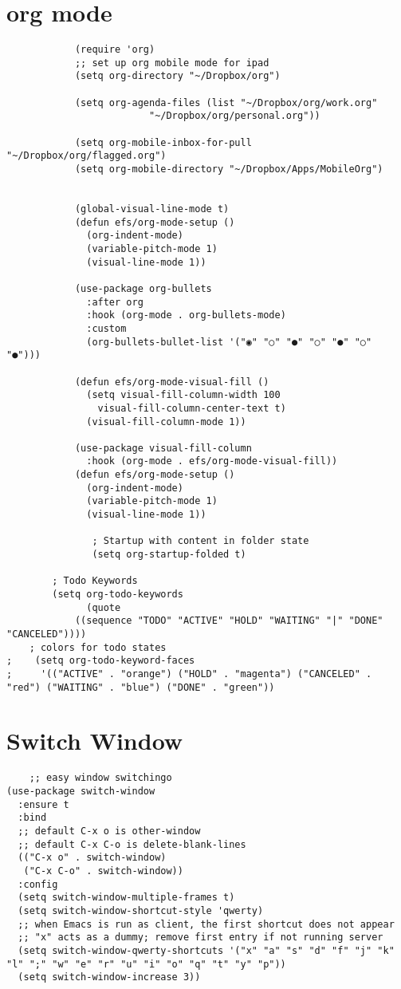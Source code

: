 \documentclass[11pt]{article}
\begin{document}
\section{org mode}
\label{sec:org41e6ce2}
\begin{verbatim}
			(require 'org)
			;; set up org mobile mode for ipad
			(setq org-directory "~/Dropbox/org")

			(setq org-agenda-files (list "~/Dropbox/org/work.org"
						 "~/Dropbox/org/personal.org"))

			(setq org-mobile-inbox-for-pull "~/Dropbox/org/flagged.org")
			(setq org-mobile-directory "~/Dropbox/Apps/MobileOrg")


			(global-visual-line-mode t)
			(defun efs/org-mode-setup ()
			  (org-indent-mode)
			  (variable-pitch-mode 1)
			  (visual-line-mode 1))

			(use-package org-bullets
			  :after org
			  :hook (org-mode . org-bullets-mode)
			  :custom
			  (org-bullets-bullet-list '("◉" "○" "●" "○" "●" "○" "●")))

			(defun efs/org-mode-visual-fill ()
			  (setq visual-fill-column-width 100
				visual-fill-column-center-text t)
			  (visual-fill-column-mode 1))

			(use-package visual-fill-column
			  :hook (org-mode . efs/org-mode-visual-fill))
			(defun efs/org-mode-setup ()
			  (org-indent-mode)
			  (variable-pitch-mode 1)
			  (visual-line-mode 1))

		       ; Startup with content in folder state
		       (setq org-startup-folded t)

		; Todo Keywords
		(setq org-todo-keywords
		      (quote
			((sequence "TODO" "ACTIVE" "HOLD" "WAITING" "|" "DONE" "CANCELED"))))
    ; colors for todo states
;    (setq org-todo-keyword-faces
;	  '(("ACTIVE" . "orange") ("HOLD" . "magenta") ("CANCELED" . "red") ("WAITING" . "blue") ("DONE" . "green"))

\end{verbatim}
\section{Switch Window}
\label{sec:orgcbd6d12}
\begin{verbatim}
    ;; easy window switchingo
(use-package switch-window
  :ensure t
  :bind
  ;; default C-x o is other-window
  ;; default C-x C-o is delete-blank-lines
  (("C-x o" . switch-window)
   ("C-x C-o" . switch-window))
  :config
  (setq switch-window-multiple-frames t)
  (setq switch-window-shortcut-style 'qwerty)
  ;; when Emacs is run as client, the first shortcut does not appear
  ;; "x" acts as a dummy; remove first entry if not running server
  (setq switch-window-qwerty-shortcuts '("x" "a" "s" "d" "f" "j" "k" "l" ";" "w" "e" "r" "u" "i" "o" "q" "t" "y" "p"))
  (setq switch-window-increase 3))
\end{verbatim}
\end{document}
